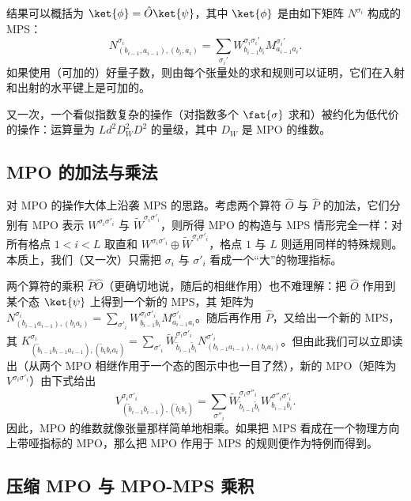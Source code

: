 结果可以概括为 $\ket{\phi}=\hat{O}\ket{\psi}$，其中 $\ket{\phi}$ 是由如下矩阵 $N^{\sigma_i}$ 构成的 MPS：
\begin{equation}
N^{\sigma_i}_{(b_{i-1},a_{i-1}),(b_i,a_i)} = \sum_{\sigma_i'} W^{\sigma_i\sigma_i'}_{b_{i-1}b_i} M^{\sigma_i'}_{a_{i-1}a_i} .
\end{equation}
如果使用（可加的）好量子数，则由每个张量处的求和规则可以证明，它们在入射和出射的水平键上是可加的。

又一次，一个看似指数复杂的操作（对指数多个 $\fat{\sigma}$ 求和）被约化为低代价的操作：运算量为
$Ld^2 D_W^2 D^2$ 的量级，其中 $D_W$ 是 MPO 的维数。

\subsection{MPO 的加法与乘法}

对 MPO 的操作大体上沿袭 MPS 的思路。考虑两个算符 $\hat{O}$ 与 $\hat{P}$ 的加法，它们分别有 MPO 表示 $W^{\sigma_i\sigma'_i}$ 与
$\tilde{W}^{\sigma_i\sigma'_i}$，则所得 MPO 的构造与 MPS 情形完全一样：对所有格点 $1 < i < L$ 取直和 $W^{\sigma_i\sigma'_i} \oplus \tilde{W}^{\sigma_i\sigma'_i}$，格点 $1$ 与 $L$ 则适用同样的特殊规则。本质上，我们（又一次）只需把 $\sigma_i$ 与 $\sigma'_i$ 看成一个``大''的物理指标。

两个算符的乘积 $\hat{P} \hat{O}$（更确切地说，随后的相继作用）也不难理解：把 $\hat{O}$ 作用到某个态 $\ket{\psi}$ 上得到一个新的 MPS，其
矩阵为 $N^{\sigma_i}_{(b_{i-1}a_{i-1}),(b_i a_i)} = \sum_{\sigma'_i} W^{\sigma_i\sigma'_i}_{b_{i-1}b_i} M^{\sigma'_i}_{a_{i-1}a_i}$。随后再作用 $\hat{P}$，又给出一个新的 MPS，其 $K^{\sigma_i}_{(\tilde{b}_{i-1}b_{i-1}a_{i-1}),(\tilde{b}_i b_i a_i)} =  \sum_{\sigma'_i} \tilde{W}^{\sigma_i\sigma'_i}_{\tilde{b}_{i-1} \tilde{b}_i} N^{\sigma'_i}_{(b_{i-1}a_{i-1}),(b_i a_i)}$。但由此我们可以立即读出（从两个 MPO 相继作用于一个态的图示中也一目了然），新的 MPO（矩阵为 $V^{\sigma_i\sigma'_i}$）由下式给出
\begin{equation}
V^{\sigma_i\sigma'_i}_{(\tilde{b}_{i-1}b_{i-1}),(\tilde{b}_{i}b_{i})} = \sum_{\sigma''_i} 
\tilde{W}^{\sigma_i\sigma''_i}_{\tilde{b}_{i-1} \tilde{b}_i} W^{\sigma''_i\sigma'_i}_{b_{i-1}b_i} .
\end{equation}
因此，MPO 的维数就像张量那样简单地相乘。如果把 MPS 看成在一个物理方向上带哑指标的 MPO，那么把 MPO 作用于 MPS 的规则便作为特例而得到。
 
\subsection{压缩 MPO 与 MPO-MPS 乘积}

